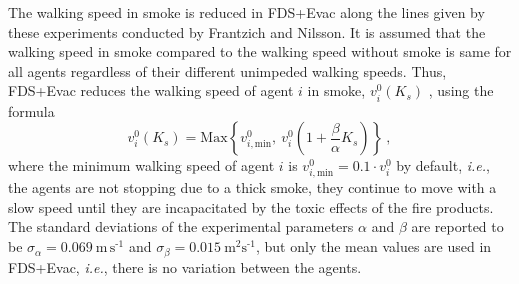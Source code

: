 \documentclass[12pt,a4paper,final,twoside]{stylevk}
\begin{document}
The walking speed in smoke is reduced in FDS+Evac along the lines
given by these experiments conducted by Frantzich and Nilsson.  It is
assumed that the walking speed in smoke compared to the walking speed
without smoke is same for all agents regardless of their different
unimpeded walking speeds.  Thus, FDS+Evac reduces the walking speed of
agent $i$ in smoke, $v^0_i (K_s)$ , using the formula
%
\begin{equation}\label{Eq_SpeedSmoke}
  v^0_i (K_s) = \mathrm{Max} \left \{ v^0_{i,\mathrm{min}} ,~
  v^0_i \left ( 1 + \frac{\beta}{\alpha} K_s \right ) \right \} ~,
\end{equation}
%
where the minimum walking speed of agent $i$ is $ v^0_{i,\mathrm{min}}
= 0.1 \cdot v^0_i$ by default, \emph{i.e.}, the agents are not
stopping due to a thick smoke, they continue to move with a slow speed
until they are incapacitated by the toxic effects of the fire
products.  The standard deviations of the experimental parameters
$\alpha$ and $\beta$ are reported to be $\sigma_\alpha =
0.069~\mathrm{ \textrm{m} \, \textrm{s}^\textrm{-1} } $ and
$\sigma_\beta = 0.015~ \mathrm{ \textrm{m}^\textrm{2}
  \textrm{s}^\textrm{-1} } $, but only the mean values are used in
FDS+Evac, \emph{i.e.}, there is no variation between the agents.

\end{document}
